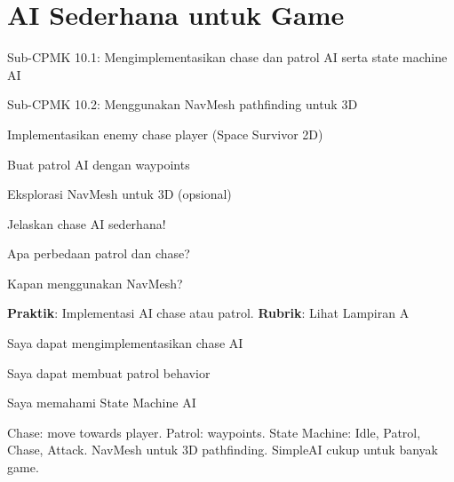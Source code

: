 \documentclass[../main]{subfiles}
\begin{document}
\chapter{AI Sederhana untuk Game}

\begin{subcpmk}
  \item Sub-CPMK 10.1: Mengimplementasikan chase dan patrol AI serta state machine AI
  \item Sub-CPMK 10.2: Menggunakan NavMesh pathfinding untuk 3D
\end{subcpmk}




\begin{aktivitas}
  \item Implementasikan enemy chase player (Space Survivor 2D)
  \item Buat patrol AI dengan waypoints
  \item Eksplorasi NavMesh untuk 3D (opsional)
\end{aktivitas}

\begin{latihan}
  \item Jelaskan chase AI sederhana!
  \item Apa perbedaan patrol dan chase?
  \item Kapan menggunakan NavMesh?
\end{latihan}

\begin{asesmen}
\textbf{Praktik}: Implementasi AI chase atau patrol.
\textbf{Rubrik}: Lihat Lampiran A
\end{asesmen}

\begin{checklist}
  \item Saya dapat mengimplementasikan chase AI
  \item Saya dapat membuat patrol behavior
  \item Saya memahami State Machine AI
\end{checklist}

\begin{rangkuman}
Chase: move towards player. Patrol: waypoints. State Machine: Idle, Patrol, Chase, Attack. NavMesh untuk 3D pathfinding. SimpleAI cukup untuk banyak game.
\end{rangkuman}

\ifSubfilesClassLoaded{
  \renewcommand{\bibname}{Daftar Pustaka}
  
  
}{}
\end{document}
